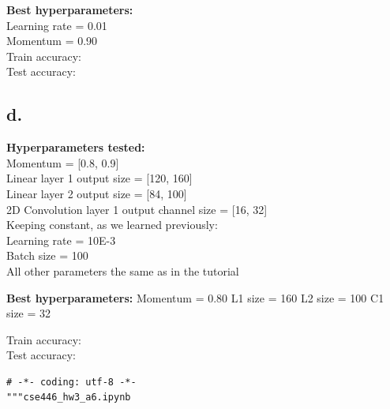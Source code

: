 \documentclass{article}
\newcommand{\1}{\mathbf{1}}
\begin{document}
{\textbf{Best hyperparameters:} \\ 
Learning rate = 0.01 \\ 
Momentum = 0.90 \\
Train accuracy: \\
Test accuracy: 


\subsection*{d.}

\textbf{Hyperparameters tested:} \\
Momentum = [0.8, 0.9] \\
Linear layer 1 output size = [120, 160] \\ 
Linear layer 2 output size = [84, 100] \\
2D Convolution layer 1 output channel size = [16, 32] \\
Keeping constant, as we learned previously: \\
Learning rate = 10E-3 \\
Batch size = 100 \\
All other parameters the same as in the tutorial 




\textbf{Best hyperparameters:}
Momentum = 0.80
L1 size = 160
L2 size = 100
C1 size = 32


Train accuracy: \\
Test accuracy: 

\newpage

\begin{verbatim}
# -*- coding: utf-8 -*-
"""cse446_hw3_a6.ipynb


\end{verbatim}}
\end{document}
